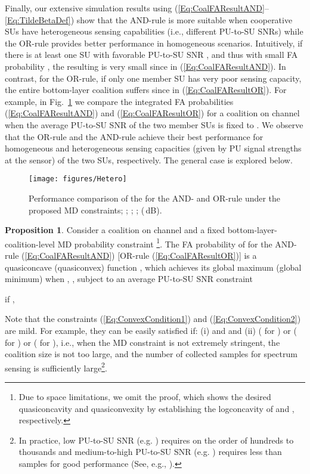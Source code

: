 \documentclass[journal,draftclsnofoot,onecolumn]{IEEEtran}
\theoremstyle{definition}
\newtheorem{Prop}{Proposition}
\def\FigScale{0.6}
\def\FigScale{0.65}
\begin{document}
Finally, our extensive simulation results using (\ref{Eq:CoalFAResultAND}--\ref{Eq:TildeBetaDef}) show that the AND-rule is more suitable when cooperative SUs have heterogeneous sensing capabilities (i.e., different PU-to-SU SNRs) while the OR-rule provides better performance in homogeneous scenarios. Intuitively, if there is at least one SU  with favorable PU-to-SU SNR , and thus with small FA probability , the resulting  is very small since  in (\ref{Eq:CoalFAResultAND}). In contrast, for the OR-rule, if only one member SU has very poor sensing capacity, the entire bottom-layer coalition  suffers since  in (\ref{Eq:CoalFAResultOR}). For example, in Fig.~\ref{Fig:Hetero} we compare the integrated FA probabilities (\ref{Eq:CoalFAResultAND}) and (\ref{Eq:CoalFAResultOR}) for a coalition  on channel  when the average PU-to-SU SNR of the two member SUs is fixed to . We observe that the OR-rule and the AND-rule achieve their best performance for homogeneous and heterogeneous sensing capacities (given by PU signal strengths at the sensor) of the two SUs, respectively.  The general case is explored below\cite{YLuThesis}.

\begin{figure}[!t]
    \centering
    \texttt{[image: figures/Hetero]}
    \caption{Performance comparison of the  for the AND- and OR-rule under the proposed MD constraints; ; ; ;  (\,dB).}
    \label{Fig:Hetero}
\end{figure}


\begin{Prop} \label{Prop:Convex} Consider a coalition  on channel  and a fixed bottom-layer-coalition-level MD probability constraint \footnote{Due to space limitations, we omit the proof, which shows the desired quasiconcavity and quasiconvexity by establishing the logconcavity of  and , respectively\cite{YLuThesis}.}. The FA probability of  for the AND-rule (\ref{Eq:CoalFAResultAND}) [OR-rule (\ref{Eq:CoalFAResultOR})] is a quasiconcave (quasiconvex) function \cite[Section 3.4]{ConvexOpt}, which achieves its global maximum (global minimum) when , , subject to an average PU-to-SU SNR constraint

if ,


\end{Prop}
Note that the constraints (\ref{Eq:ConvexCondition1}) and (\ref{Eq:ConvexCondition2}) are mild\cite{YLuThesis}. For example, they can be easily satisfied if: (i)  and  and (ii) ( for ) or ( for ) or ( for ), i.e., when the MD constraint   is not extremely stringent, the coalition size  is not too large, and the number of collected samples for spectrum sensing  is sufficiently large{\footnote{In practice, low PU-to-SU SNR (e.g. ) requires  on the order of hundreds to thousands and medium-to-high PU-to-SU SNR (e.g. ) requires less than  samples for good performance (See, e.g., \cite{Tradeoff,CoopSense}).}}.
\end{document}
